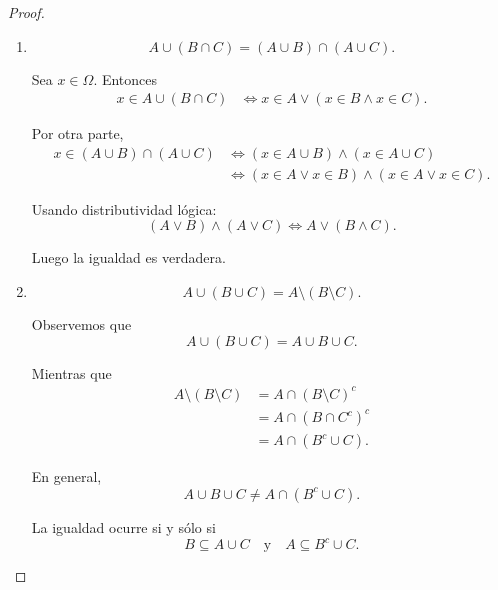 \documentclass[12pt,a4paper]{article}
\begin{document}
    \begin{proof}
        \begin{enumerate}[label=(\alph*)]
    
            \item 
            \[
                A \cup (B \cap C)
                = (A \cup B) \cap (A \cup C).
            \]
    
            Sea $x\in\Omega$. Entonces
            \begin{align*}
                x\in A\cup(B\cap C)
                &\iff x\in A \lor (x\in B \land x\in C).
            \end{align*}
    
            Por otra parte,
            \begin{align*}
                x\in (A\cup B)\cap(A\cup C)
                &\iff (x\in A\cup B)\land(x\in A\cup C) \\
                &\iff (x\in A \lor x\in B)\land(x\in A \lor x\in C).
            \end{align*}
    
            Usando distributividad lógica:
            \[
                (A\lor B)\land(A\lor C)
                \iff A \lor (B\land C).
            \]
    
            Luego la igualdad es verdadera.
    
            \item
            \[
                A \cup (B \cup C)
                = A \setminus (B \setminus C).
            \]
    
            Observemos que
            \[
                A \cup (B\cup C)=A\cup B\cup C.
            \]
    
            Mientras que
            \begin{align*}
                A\setminus(B\setminus C)
                &= A\cap(B\setminus C)^c \\
                &= A\cap(B\cap C^c)^c \\
                &= A\cap(B^c\cup C).
            \end{align*}
    
            En general,
            \[
                A\cup B\cup C \neq A\cap(B^c\cup C).
            \]
    
            La igualdad ocurre si y sólo si
            \[
                B\subseteq A\cup C
                \quad \text{y} \quad
                A\subseteq B^c\cup C.
            \]
    

\end{enumerate}
\end{proof}
\end{document}
